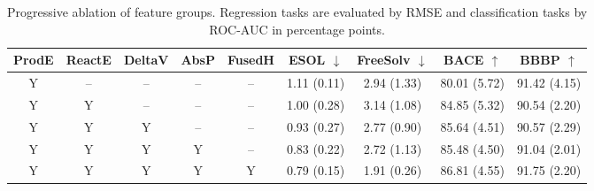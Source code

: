 \begin{table}[t]
\centering
{\small
\setlength{\tabcolsep}{4pt}
\begin{tabular}{ccccc*{4}{c}}
\hline
ProdE & ReactE & DeltaV & AbsP & FusedH & ESOL $\downarrow$ & FreeSolv $\downarrow$ & BACE $\uparrow$ & BBBP $\uparrow$ \\
\hline
Y & -- & -- & -- & -- & 1.11 (0.11) & 2.94 (1.33) & 80.01 (5.72) & 91.42 (4.15) \\
Y & Y & -- & -- & -- & 1.00 (0.28) & 3.14 (1.08) & 84.85 (5.32) & 90.54 (2.20) \\
Y & Y & Y & -- & -- & 0.93 (0.27) & 2.77 (0.90) & 85.64 (4.51) & 90.57 (2.29) \\
Y & Y & Y & Y & -- & 0.83 (0.22) & 2.72 (1.13) & 85.48 (4.50) & 91.04 (2.01) \\
Y & Y & Y & Y & Y & 0.79 (0.15) & 1.91 (0.26) & 86.81 (4.55) & 91.75 (2.20) \\
\hline
\end{tabular}
}
\caption{Progressive ablation of feature groups. Regression tasks are evaluated by RMSE and classification tasks by ROC-AUC in percentage points.}
\label{tab:ablation_progressive}
\end{table}
